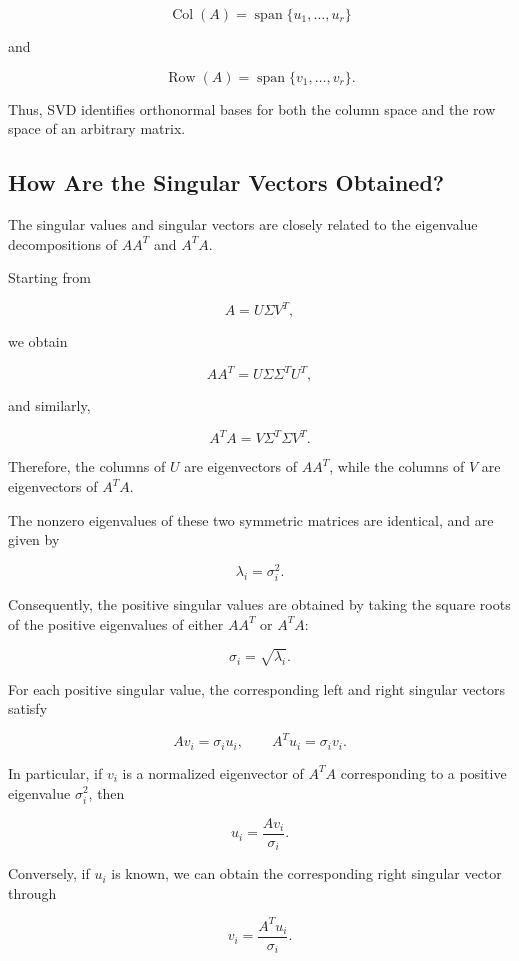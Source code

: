 \documentclass[11pt]{article}
\begin{document}
\[
\boxed{
\operatorname{Col}(A)
=
\operatorname{span}
\{u_1,\ldots,u_r\}
}
\]

and

\[
\boxed{
\operatorname{Row}(A)
=
\operatorname{span}
\{v_1,\ldots,v_r\}.
}
\]

Thus, SVD identifies orthonormal bases
for both the column space and the
row space of an arbitrary matrix.

\subsection{How Are the Singular Vectors Obtained?}

The singular values and singular vectors
are closely related to the eigenvalue
decompositions of $AA^T$ and $A^TA$.

Starting from

\[
A=U\Sigma V^T,
\]

we obtain

\[
AA^T
=
U\Sigma\Sigma^TU^T,
\]

and similarly,

\[
A^TA
=
V\Sigma^T\Sigma V^T.
\]

Therefore, the columns of $U$ are
eigenvectors of $AA^T$, while the
columns of $V$ are eigenvectors
of $A^TA$.

The nonzero eigenvalues of these
two symmetric matrices are identical,
and are given by

\[
\boxed{\lambda_i=\sigma_i^2.}
\]

Consequently, the positive singular
values are obtained by taking the
square roots of the positive eigenvalues
of either $AA^T$ or $A^TA$:

\[
\sigma_i=\sqrt{\lambda_i}.
\]

For each positive singular value,
the corresponding left and right
singular vectors satisfy

\[
\boxed{
Av_i=\sigma_i u_i,
\qquad
A^Tu_i=\sigma_i v_i.
}
\]

In particular, if $v_i$ is a normalized
eigenvector of $A^TA$ corresponding
to a positive eigenvalue $\sigma_i^2$,
then

\[
\boxed{
u_i=\frac{Av_i}{\sigma_i}.
}
\]

Conversely, if $u_i$ is known, we can
obtain the corresponding right singular
vector through

\[
\boxed{
v_i=\frac{A^Tu_i}{\sigma_i}.
}
\]
\end{document}
